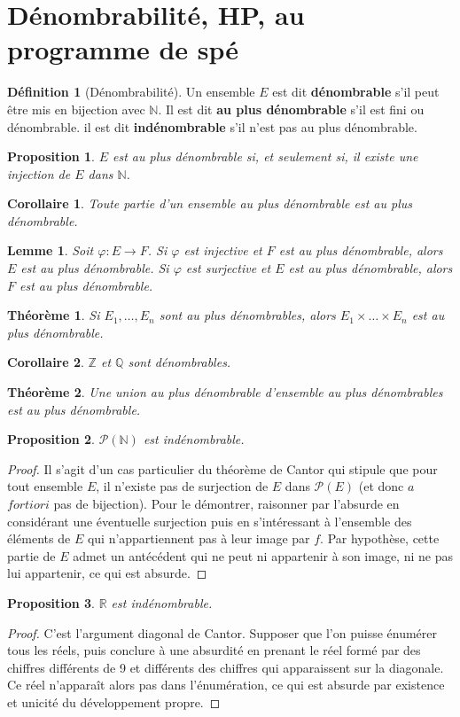 \documentclass[french]{book}
\newcommand{\N}{\mathbb{N}}
\newcommand{\Z}{\mathbb{Z}}
\newcommand{\Q}{\mathbb{Q}}
\newcommand{\R}{\mathbb{R}}
\theoremstyle{plain}
\newtheorem{thm}{Théorème}[chapter]
\newtheorem{lem}{Lemme}[chapter]
\newtheorem{prop}{Proposition}[chapter]
\newtheorem{cor}{Corollaire}[chapter]
\theoremstyle{definition}
\newtheorem{dfn}{Définition}[chapter]
\theoremstyle{remark}
\begin{document}
\section{Dénombrabilité, HP, au programme de spé}
\begin{dfn}[Dénombrabilité]
	Un ensemble $E$ est dit \textbf{dénombrable} s'il peut être mis en bijection avec $\N$. Il est dit \textbf{au plus dénombrable} s'il est fini ou dénombrable. il est dit \textbf{indénombrable} s'il n'est pas au plus dénombrable.
\end{dfn}
\begin{prop}
	$E$ est au plus dénombrable si, et seulement si, il existe une injection de $E$ dans $\N$.
\end{prop}
\begin{cor}
	Toute partie d'un ensemble au plus dénombrable est au plus dénombrable.
\end{cor}
\begin{lem}
	Soit $\varphi:E\rightarrow F$. Si $\varphi$ est injective et $F$ est au plus dénombrable, alors $E$ est au plus dénombrable. Si $\varphi$ est surjective et $E$ est au plus dénombrable, alors $F$ est au plus dénombrable.
\end{lem}
\begin{thm}
	Si $E_1,\ldots,E_n$ sont au plus dénombrables, alors $E_1\times\ldots\times E_n$ est au plus dénombrable.
\end{thm}
\begin{cor}
	$\Z$ et $\Q$ sont dénombrables.
\end{cor}
\begin{thm}
	Une union au plus dénombrable d'ensemble au plus dénombrables est au plus dénombrable.
\end{thm}
\begin{prop}
	$\mathcal{P}(\N)$ est indénombrable.
\end{prop}
\begin{proof}
	Il s'agit d'un cas particulier du théorème de Cantor qui stipule que pour tout ensemble $E$, il n'existe pas de surjection de $E$ dans $\mathcal{P}(E)$ (et donc $a$ $fortiori$ pas de bijection). Pour le démontrer, raisonner par l'absurde en considérant une éventuelle surjection puis en s'intéressant à l'ensemble des éléments de $E$ qui n'appartiennent pas à leur image par $f$. Par hypothèse, cette partie de $E$ admet un antécédent qui ne peut ni appartenir à son image, ni ne pas lui appartenir, ce qui est absurde.
\end{proof}
\begin{prop}
	$\R$ est indénombrable.
\end{prop}
\begin{proof}
	C'est l'argument diagonal de Cantor. Supposer que l'on puisse énumérer tous les réels, puis conclure à une absurdité en prenant le réel formé par des chiffres différents de 9 et différents des chiffres qui apparaissent sur la diagonale. Ce réel n'apparaît alors pas dans l'énumération, ce qui est absurde par existence et unicité du développement propre.
\end{proof}
\end{document}
